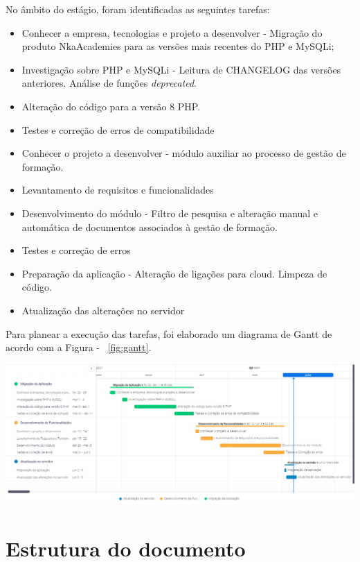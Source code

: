 No âmbito do estágio, foram identificadas as seguintes tarefas:

\begin{itemize}
    \item  Conhecer a empresa, tecnologias e projeto a desenvolver - Migração do produto NkaAcademies para as versões mais recentes do PHP e MySQLi;
    \item  Investigação sobre PHP e MySQLi - Leitura de CHANGELOG das versões anteriores. Análise de funções \textit{deprecated}.
    \item  Alteração do código para a versão 8 PHP.
    \item  Testes e correção de erros de compatibilidade
    \item  Conhecer o projeto a desenvolver - módulo auxiliar ao processo de gestão de formação.
    \item Levantamento de requisitos e funcionalidades
    \item  Desenvolvimento do módulo - Filtro de pesquisa e alteração manual e automática de documentos associados à gestão de formação.
    \item Testes e correção de erros
    \item  Preparação da aplicação - Alteração de ligações para cloud. Limpeza de código.
    \item Atualização das alterações no servidor
\end{itemize}
Para planear a execução das tarefas, foi elaborado um diagrama de Gantt de acordo com a Figura - ~\ref{fig:gantt}.

\begin{center}
        \includegraphics[width=\textwidth,height=\textheight,keepaspectratio]{images/unknown.png}
        \label{fig:gantt}
\end{center}


\section{Estrutura do documento}

